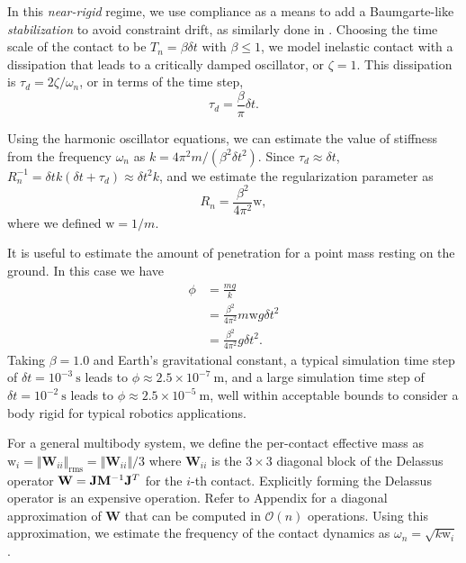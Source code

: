 In this \emph{near-rigid} regime, we use compliance as a means to add a
Baumgarte-like \emph{stabilization} to avoid constraint drift, as similarly
done in \cite{bib:todorov2011}. Choosing the time scale of the contact to be
$T_n = \beta \delta t$ with $\beta \le 1$, we model inelastic contact with a dissipation
that leads to a critically damped oscillator, or $\zeta=1$. This dissipation is
$\tau_d=2\zeta/\omega_n$, or in terms of the time step,
\begin{equation}
    \tau_d=\frac{\beta}{\pi}\delta t.
\end{equation}

Using the harmonic oscillator equations, we can estimate the value of stiffness
from the frequency $\omega_n$ as $k=4\pi^2 m/(\beta^2 \delta t^2)$. Since
$\tau_d\approx\delta t$, $R_n^{-1} = \delta t k(\delta t+\tau_d) \approx \delta
t^2k$, and we estimate the regularization parameter as
\begin{equation}
	R_n = \frac{\beta^2}{4\pi^2}\text{w},
\end{equation}
where we defined $\text{w}=1/m$.

It is useful to estimate the amount of penetration for a point mass resting on
the ground. In this case we have
\begin{align*}
	\phi &= \frac{mg}{k} \\
	&= \frac{\beta^2}{4\pi^2}m\text{w}g\delta t^2\\
	&= \frac{\beta^2}{4\pi^2}g\delta t^2.
\end{align*}
Taking $\beta=1.0$ and Earth's gravitational constant, a typical simulation
time step of $\delta t=10^{-3}~\text{s}$ leads to $\phi\approx 2.5\times
10^{-7}~\text{m}$, and a large simulation time step of $\delta
t=10^{-2}~\text{s}$ leads to $\phi\approx 2.5\times 10^{-5}~\text{m}$, well
within acceptable bounds to consider a body rigid for typical robotics
applications.

For a general multibody system, we define the per-contact effective mass as
$\text{w}_i=\Vert\mathbf{W}_{ii}\Vert_\text{rms}=\Vert\mathbf{W}_{ii}\Vert/3$ where
$\mathbf{W}_{ii}$ is the $3\times 3$ diagonal block of the Delassus operator
$\mathbf{W}={\mathbf{J}}{\mathbf{M}}^{-1}{\mathbf{J}}^T$ for the $i$-th contact. Explicitly forming the Delassus
operator is an expensive operation. Refer to Appendix \RedHighlight{[O(n)
Approximation of W]} for a diagonal approximation of $\mathbf{W}$ that can be
computed in $\mathcal{O}(n)$ operations. Using this approximation, we estimate the
frequency of the contact dynamics as $\omega_n=\sqrt{k\text{w}_i}$.

